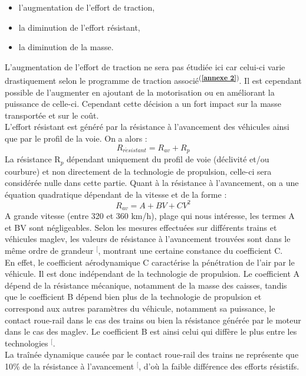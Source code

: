 \documentclass[12pt, a4paper, onecolumn]{article}
\makeatletter
\renewcommand{\tab}{\tabto{15px}}
\newcommand{\csvdel}{}
\newcommand{\bettercite}[1][,]{%
  \renewcommand{\csvdel}{\renewcommand{\csvdel}{}}%
  \csname\endcsname$^[$\checknextarg}
\newcommand{\checknextarg}{\@ifnextchar\bgroup{\gobblenext}{}}%
\newcommand{\gobblenext}[1]{\csvdel\textcolor{blue}{\textbf{\cite{#1}}}\@ifnextchar\bgroup{$^,$\gobblenext}{$^]$}}%
\newcommand{\cfannexe}[1]{\textsuperscript{(\textcolor{blue}{\textbf{\ref{annexe #1}}})}}
\makeatother
\begin{document}
\begin{itemize}
  \item l'augmentation de l'effort de traction,
  \item la diminution de l'effort résistant,
  \item la diminution de la masse.
\end{itemize}
\tab L’augmentation de l’effort de traction ne sera pas étudiée ici car celui-ci varie drastiquement selon le programme de traction associé\cfannexe{2}.
Il est cependant possible de l’augmenter en ajoutant de la motorisation ou en améliorant la puissance de celle-ci.
Cependant cette décision a un fort impact sur la masse transportée et sur le coût. \\
\linebreak
\tab L'effort résistant est généré par la résistance à l'avancement des véhicules ainsi que par le profil de la voie. On a alors :
$$R_{r\acute{e}sistant} = R_{av} + R_p$$
La résistance R$_p$ dépendant uniquement du profil de voie (déclivité et/ou courbure) et non directement de la technologie de propulsion, celle-ci sera considérée nulle dans cette partie.
Quant à la résistance à l'avancement, on a une équation quadratique dépendant de la vitesse et de la forme :
$$R_{av} = A + BV + CV^2$$
\tab A grande vitesse (entre 320 et 360 km/h), plage qui nous intéresse, les termes A et BV sont négligeables.
Selon les mesures effectuées sur différents trains et véhicules maglev, les valeurs de résistance à l’avancement trouvées sont dans le même ordre de grandeur\bettercite{ei}, montrant une certaine constance du coefficient C. \\
\tab En effet, le coefficient aérodynamique C caractérise la pénétration de l'air par le véhicule.
Il est donc indépendant de la technologie de propulsion.
Le coefficient A dépend de la résistance mécanique, notamment de la masse des caisses, tandis que le coefficient B dépend bien plus de la technologie de propulsion et correspond aux autres paramètres du véhicule, notamment sa puissance, le contact roue-rail dans le cas des trains ou bien la résistance générée par le moteur dans le cas des maglev.
Le coefficient B est ainsi celui qui diffère le plus entre les technologies\bettercite{thesetgv}{ei}. \\
\tab La traînée dynamique causée par le contact roue-rail des trains ne représente que 10\% de la résistance à l'avancement\bettercite{maglevintube}, d'où la faible différence des efforts résistifs. \\
\linebreak
\end{document}
